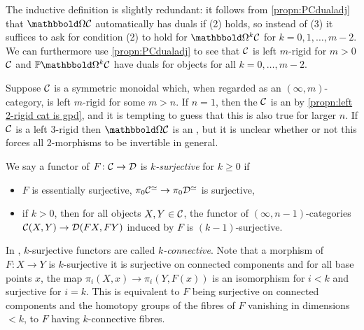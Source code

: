 \documentclass[a4paper,11pt]{article}
\begin{document}
\begin{observation}\label{obs:m-rig defn}
  The inductive definition is slightly redundant: it follows from
  \cref{propn:PCdualadj} that $\mOm \nC$ automatically has duals if
  (2) holds, so instead of (3) it suffices to ask for condition (2) to
  hold for $\mOm^{k}\nC$ for $k = 0,1,\dots,m-2$. We can furthermore
  use \cref{propn:PCdualadj} to see that $\mathcal{C}$ is 
  left $m$-rigid for $m>0$ \IFF{}
  $\mathcal{C}$ and $\mP\mOm^{k}\nC$ have duals for objects for all $k = 0,\dots,m-2$.
\end{observation}

\begin{question}
  Suppose $\mathcal{C}$ is a symmetric monoidal \incat{} which, when regarded
  as an $(\infty,m)$-category, is left $m$-rigid for some $m>n$. If
  $n = 1$, then the \icat{} $\mathcal{C}$ is an \igpd{} by
  \cref{propn:left 2-rigid cat is gpd}, and it is tempting to guess
  that this is also true for larger $n$. If $\mathcal{C}$ is a left 3-rigid
  \itcat{} then $\mOm\nC$ is an \igpd{}, but it is unclear whether or not
  this forces all 2-morphisms to be invertible in general.
\end{question}

\begin{defn}
  We say a functor of \incats{} $F \colon \nC \to \nD$ is
  \emph{$k$-surjective} for $k \geq 0$ if
  \begin{itemize}
  \item $F$ is essentially surjective, \ie{} $\pi_{0}\nC^{\simeq} \to
    \pi_{0}\nD^{\simeq}$ is surjective,
  \item if $k > 0$, then for all objects $X,Y \in \mathcal{C}$, the functor of
    $(\infty,n-1)$-categories $\nC(X,Y) \to \nD(FX,FY)$ induced by $F$
    is $(k-1)$-surjective.
  \end{itemize}
\end{defn}

\begin{remark}\label{rmk:k-surj gpd}
  In \cite{LurieCob}, $k$-surjective functors are called
  \emph{$k$-connective}. Note that a morphism of \igpds{}
  $F \colon X \to Y$ is $k$-surjective \IFF{} it is surjective on
  connected components and for all base points $x$,
  the map $\pi_{i}(X,x) \to \pi_{i}(Y,F(x))$ is an isomorphism for
  $i < k$ and surjective for $i = k$. This is equivalent to $F$ being
  surjective on connected components and the homotopy groups of the
  fibres of $F$ vanishing in dimensions $< k$, \ie{} to $F$ having
  $k$-connective fibres. 
\end{remark}
\end{document}
